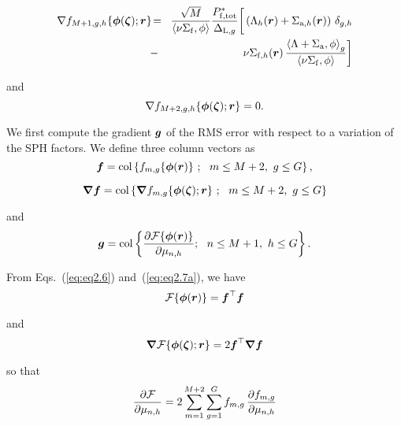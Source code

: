 \begin{eqnarray}
\nonumber \nabla f_{M+1,g,h}\{\bff(\phi)(\bff(\zeta));\bff(r)\} \negthinspace &=& \negthinspace { \sqrt{M} \over \left< \nu\Sigma_{\rm f} , \phi \right>} {P^*_{{\rm f},{\rm tot}}\over \Delta_{{\rm L},g} } \bigg[ \left(\Lambda_{h}(\bff(r))+\Sigma_{{\rm a},h}(\bff(r))\right) \, \delta_{g,h} \\
&-& \negthinspace \nu\Sigma_{{\rm f},h}(\bff(r))\, {\left< \Lambda+\Sigma_{\rm a} , \phi \right>_{g}\over \left< \nu\Sigma_{\rm f} , \phi \right>} \bigg]
\label{eq:eq2.14}
\end{eqnarray}

\noindent and
\begin{equation}
\nabla f_{M+2,g,h}\{\bff(\phi)(\bff(\zeta));\bff(r)\} = 0 .
\label{eq:eq2.15}
\end{equation}

\vskip 0.08cm

We first compute the gradient $\bff(g)$ of the RMS error with respect to a variation of the SPH factors. We define three column vectors as
\begin{equation}
\bff(f)={\rm col} \left\{ f_{m,g}\{\bff(\phi)(\bff(r))\} \ ; \ \ m\le M+2, \ g\le G \right\} ,
\label{eq:eq2.16}
\end{equation}

\begin{equation}
\bff(\nabla)\bff(f)={\rm col} \left\{ \bff(\nabla)f_{m,g}\{\bff(\phi)(\bff(\zeta));\bff(r)\} \ ; \ \ m\le M+2, \ g\le G \right\} 
\label{eq:eq2.17}
\end{equation}

\noindent and
\begin{equation}
\bff(g)={\rm col} \left\{ {\partial {\cal F}\{\bff(\phi)(\bff(r))\} \over \partial \mu_{n,h}} ; \ \ n\le M+1, \ h\le G \right\} .
\label{eq:eq2.18}
\end{equation}

\vskip 0.08cm

From Eqs.~(\ref{eq:eq2.6}) and~(\ref{eq:eq2.7a}), we have
\begin{equation}
{\cal F}\{\bff(\phi)(\bff(r))\}=\bff(f)^\top \bff(f)
\label{eq:eq2.19}
\end{equation}

\noindent and
\begin{equation}
\bff(\nabla){\cal F}\{\bff(\phi)(\bff(\zeta));\bff(r)\}=2\bff(f)^\top \bff(\nabla)\bff(f)
\label{eq:eq2.20}
\end{equation}

\noindent so that
\begin{equation}
{\partial {\cal F} \over \partial \mu_{n,h}} =2\sum_{m=1}^{M+2} \sum_{g=1}^G  f_{m,g}\,  {\partial  f_{m,g} \over  \partial \mu_{n,h}}
\label{eq:eq2.21}
\end{equation}

